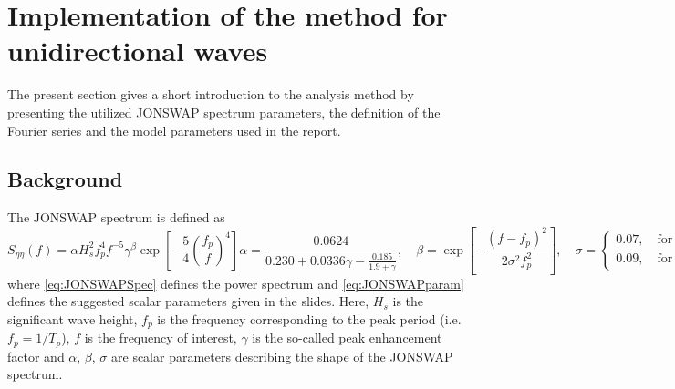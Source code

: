 \chapter{Implementation of the method for unidirectional waves}
The present section gives a short introduction to the analysis method by presenting the utilized JONSWAP spectrum parameters, the definition of the Fourier series and the model parameters used in the report. 
\section{Background}
The JONSWAP spectrum is defined as
\begin{subequations}
\begin{equation}
    S_{\eta \eta}(f) = \alpha H_s^2 f_p^4 f^{-5} \gamma^\beta \exp{\left[-\frac{5}{4}\left(\frac{f_p}{f}\right)^4\right]}
    \label{eq:JONSWAPSpec}
\end{equation} 
\begin{equation}
    \alpha =\frac{0.0624}{0.230+0.0336\gamma-\frac{0.185}{1.9+\gamma}} ,\quad \beta = \exp{\left[ -\frac{(f-f_p)^2}{2\sigma^2f_p^2} \right]}, \quad
    \sigma =
    \begin{cases}
    0.07, \quad \text{for }f\leq f_p \\
    0.09, \quad \text{for }f> f_p
    \end{cases},
    \label{eq:JONSWAPparam}
\end{equation}
\label{eq:JONSWAP}
\end{subequations}
where \cref{eq:JONSWAPSpec} defines the power spectrum and \cref{eq:JONSWAPparam} defines the suggested scalar parameters given in the slides. Here, $H_s$ is the significant wave height, $f_p$ is the frequency corresponding to the peak period (i.e. $f_p=1/T_p$), $f$ is the frequency of interest, $\gamma$ is the so-called peak enhancement factor and $\alpha$, $\beta$, $\sigma$ are scalar parameters describing the shape of the JONSWAP spectrum. 

